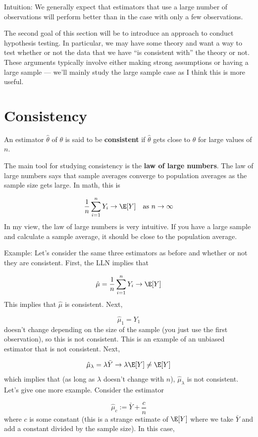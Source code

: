 \documentclass[
  letterpaper,
  DIV=11,
  numbers=noendperiod]{scrreprt}
\begin{document}
Intuition: We generally expect that estimators that use a large number
of observations will perform better than in the case with only a few
observations.

The second goal of this section will be to introduce an approach to
conduct hypothesis testing. In particular, we may have some theory and
want a way to test whether or not the data that we have ``is consistent
with'' the theory or not. These arguments typically involve either
making strong assumptions or having a large sample --- we'll mainly
study the large sample case as I think this is more useful.

\section{Consistency}\label{consistency}

An estimator \(\hat{\theta}\) of \(\theta\) is said to be
\textbf{consistent} if \(\hat{\theta}\) gets close to \(\theta\) for
large values of \(n\).

The main tool for studying consistency is the \textbf{law of large
numbers}. The law of large numbers says that sample averages converge to
population averages as the sample size gets large. In math, this is

\[
  \frac{1}{n} \sum_{i=1}^n Y_i \rightarrow \E[Y] \quad \textrm{as } n \rightarrow \infty
\] In my view, the law of large numbers is very intuitive. If you have a
large sample and calculate a sample average, it should be close to the
population average.

{Example: }Let's consider the same three estimators as before and
whether or not they are consistent. First, the LLN implies that

\[
  \hat{\mu} = \frac{1}{n} \sum_{i=1}^n Y_i \rightarrow \E[Y]
\] This implies that \(\hat{\mu}\) is consistent. Next,

\[
  \hat{\mu}_1 = Y_1
\] doesn't change depending on the size of the sample (you just use the
first observation), so this is not consistent. This is an example of an
unbiased estimator that is not consistent. Next,

\[
  \hat{\mu}_\lambda = \lambda \bar{Y} \rightarrow \lambda \E[Y] \neq \E[Y]
\] which implies that (as long as \(\lambda\) doesn't change with
\(n\)), \(\hat{\mu}_{\lambda}\) is not consistent. Let's give one more
example. Consider the estimator

\[
  \hat{\mu}_c := \bar{Y} + \frac{c}{n}
\] where \(c\) is some constant (this is a strange estimate of \(\E[Y]\)
where we take \(\bar{Y}\) and add a constant divided by the sample
size). In this case,
\end{document}

